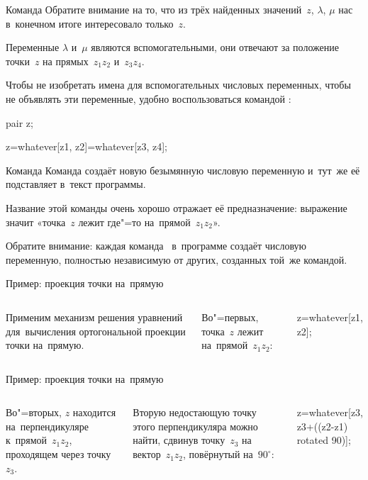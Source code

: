 \begin{frame}{Команда }
Обратите внимание на то, что из трёх найденных значений~$z$, $\lambda$, $\mu$
нас в~конечном итоге интересовало только~$z$.

Переменные $\lambda$ и~$\mu$ являются вспомогательными, они отвечают за
положение точки~$z$ на прямых~$z_1z_2$ и~$z_3z_4$.

Чтобы не изобретать имена для вспомогательных числовых переменных, чтобы не
объявлять эти переменные, удобно воспользоваться командой :
\begin{programlisting}
pair z;\par
z=whatever[z1, z2]=whatever[z3, z4];
\end{programlisting}
\end{frame}

\begin{frame}{Команда }
Команда  создаёт новую безымянную числовую переменную
и~тут~же её подставляет в~текст программы.

Название этой команды очень хорошо отражает её предназначение: выражение
 значит «точка~$z$ лежит где"=то
на~прямой~$z_1z_2$».

Обратите внимание: каждая команда~ в~программе создаёт
числовую переменную, полностью независимую от других, созданных той~же
командой.
\end{frame}

\begin{frame}{Пример: проекция точки на~прямую}
\begin{columns}
\centering
{}%
%
Применим механизм решения уравнений для~вычисления ортогональной проекции точки
на~прямую.

\pause
\bigskip
Во"=первых, точка~$z$ лежит на~прямой~$z_1z_2$:
\begin{programlisting}
z=whatever[z1, z2];
\end{programlisting}
\end{columns}
\end{frame}

\begin{frame}{Пример: проекция точки на~прямую}
\begin{columns}
\centering
{}
Во"=вторых, $z$ находится на~перпендикуляре к~прямой~$z_1z_2$, проходящем через
точку~$z_3$.

\bigskip

Вторую недостающую точку этого перпендикуляра можно найти, сдвинув точку~$z_3$
на вектор~$z_1z_2$, повёрнутый на~$90^\circ$:
\begin{programlisting}
z=whatever[z3, z3+((z2-z1) rotated 90)];
\end{programlisting}
\end{columns}
\end{frame}

